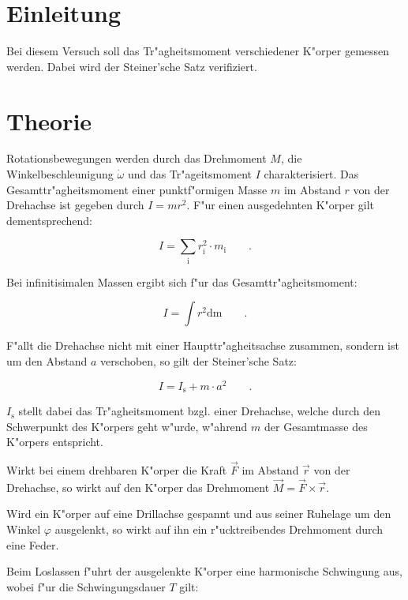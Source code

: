 \section{Einleitung} %
\label{sec:einleitung}

	Bei diesem Versuch soll das Tr"agheitsmoment verschiedener K"orper gemessen werden. Dabei wird der Steiner'sche Satz verifiziert.

\section{Theorie} %
\label{sec:theorie}

	Rotationsbewegungen werden durch das Drehmoment $M$, die Winkelbeschleunigung $\dot\omega$ und das Tr"ageitsmoment $I$ charakterisiert.
	Das Gesamttr"agheitsmoment einer punktf"ormigen Masse $m$ im Abstand $r$ von der Drehachse ist gegeben durch $I = mr^2$.
	F"ur einen ausgedehnten K"orper gilt dementsprechend:

	\begin{equation}
		I = \sum_\mathrm{i} r_\mathrm{i}^2 \cdot m_\mathrm{i} \qquad .
	\end{equation}

	Bei infinitisimalen Massen ergibt sich f"ur das Gesamttr"agheitsmoment:

	\begin{equation}
		I = \int r^2 \mathrm{dm} \qquad .
	\end{equation}

	F"allt die Drehachse nicht mit einer Haupttr"agheitsachse zusammen, sondern ist um den Abstand $a$ verschoben, so gilt der Steiner'sche Satz:

	\begin{equation}
		I = I_\mathrm{s} + m \cdot a^2 \qquad .
	\end{equation}

	$I_\mathrm{s}$ stellt dabei das Tr"agheitsmoment bzgl. einer Drehachse, welche durch den Schwerpunkt des K"orpers geht w"urde, w"ahrend $m$ der Gesamtmasse des K"orpers entspricht.

	Wirkt bei einem drehbaren K"orper die Kraft $\vec{F}$ im Abstand $\vec{r}$ von der Drehachse, so wirkt auf den K"orper das Drehmoment $\vec{M} = \vec{F} \times \vec{r}$.

	Wird ein K"orper auf eine Drillachse gespannt und aus seiner Ruhelage um den Winkel $\varphi$ ausgelenkt, so wirkt auf ihn ein r"ucktreibendes Drehmoment durch eine Feder.

	Beim Loslassen f"uhrt der ausgelenkte K"orper eine harmonische Schwingung aus, wobei f"ur die Schwingungsdauer $T$ gilt:

